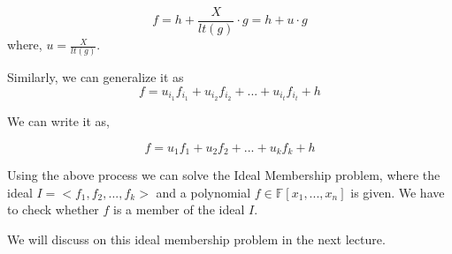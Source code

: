 $$ f = h + \frac{X}{lt(g)}\cdot g  = h + u\cdot g$$ where, $u = \frac{X}{lt(g)}$.

Similarly, we can generalize it as
$$ f = u_{i_1}f_{i_1} + u_{i_2}f_{i_2} + ... + u_{i_t}f_{i_t} + h $$

We can write it as,

$$ f = u_1f_1 + u_2f_2 + ... + u_kf_k + h $$

\begin{observation}
Using the above process we can solve the Ideal Membership problem, where the ideal $ I = <f_1,f_2,...,f_k>$ and a polynomial $f \in \mathbb{F}[x_1,...,x_n]$ is given. We have to check whether $f$ is a member of the ideal $I$.

\end{observation}


We will discuss on this ideal membership problem in the next lecture.


